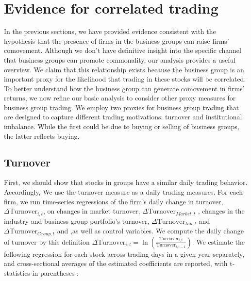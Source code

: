 

\section{{Evidence for correlated trading} }

	In the previous sections, we have provided evidence consistent with the hypothesis that the presence of firms in the business groups can raise firms' comovement. Although we don't have definitive insight into the specific channel that business groups can promote commonality, our analysis provides a useful overview.
	We claim that this relationship exists because the business group is an important proxy for the likelihood that trading in these stocks will be correlated. To better understand how the business group can generate comovement in firms' returns, we now refine our basic analysis to consider other proxy measures for business group trading.
	We employ two proxies for business group trading that are designed to capture different trading motivations: turnover and institutional imbalance. While the first could be due to buying or selling of business groups, the latter reflects buying.

		\captionsetup[subtable]{labelformat=parens, font = small}
			\renewcommand{\thesubtable}{\Alph{subtable}}

\subsection{{Turnover}}


	First, we should show that stocks in groups have a similar daily trading behavior. Accordingly, We use the turnover measure as a daily trading measures. For each firm, we run time-series regressions of the firm's daily change in turnover, $ \Delta \text{Turnover}_{i,t} $, on changes in market turnover, $ \Delta\text{Turnover}_{Market,t}   $ , changes in the industry and business group portfolio's turnover, $ \Delta\text{Turnover}_{Ind,t} $ and  $\Delta \text{Turnover}_{Group,t} $ and  ,as well as control variables. 
	We compute the daily change of turnover by this definition $ \Delta \text{Turnover}_{i,t} = \ln(\frac{\text{Turnover}_{i,t}}{\text{Turnover}_{i,t-1}}) $. 
	We estimate the following regression for each stock across trading days in a given year separately, and cross-sectional averages of the estimated coefficients are reported, with t-statistics in parentheses :
	
